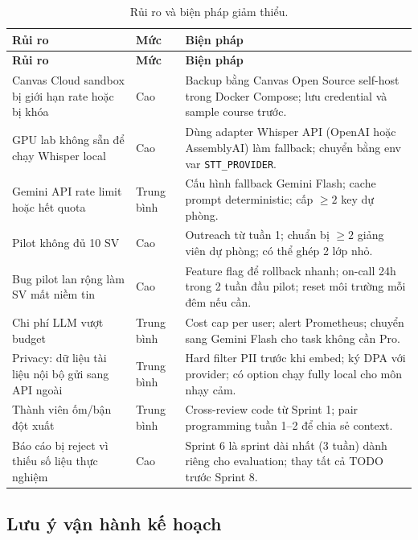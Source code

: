 \begin{longtable}{|p{4.5cm}|p{1.5cm}|p{8.5cm}|}
    \caption{Rủi ro và biện pháp giảm thiểu.}
    \label{tab:risks-gd2} \\
    \hline
    \textbf{Rủi ro} & \textbf{Mức} & \textbf{Biện pháp} \\
    \hline
    \endfirsthead
    \hline
    \textbf{Rủi ro} & \textbf{Mức} & \textbf{Biện pháp} \\
    \hline
    \endhead

    Canvas Cloud sandbox bị giới hạn rate hoặc bị khóa
        & Cao
        & Backup bằng Canvas Open Source self-host trong Docker Compose; lưu credential và sample course trước. \\ \hline
    GPU lab không sẵn để chạy Whisper local
        & Cao
        & Dùng adapter Whisper API (OpenAI hoặc AssemblyAI) làm fallback; chuyển bằng env var \texttt{STT\_PROVIDER}. \\ \hline
    Gemini API rate limit hoặc hết quota
        & Trung bình
        & Cấu hình fallback Gemini Flash; cache prompt deterministic; cấp $\geq 2$ key dự phòng. \\ \hline
    Pilot không đủ 10 SV
        & Cao
        & Outreach từ tuần 1; chuẩn bị $\geq 2$ giảng viên dự phòng; có thể ghép 2 lớp nhỏ. \\ \hline
    Bug pilot lan rộng làm SV mất niềm tin
        & Cao
        & Feature flag để rollback nhanh; on-call 24h trong 2 tuần đầu pilot; reset môi trường mỗi đêm nếu cần. \\ \hline
    Chi phí LLM vượt budget
        & Trung bình
        & Cost cap per user; alert Prometheus; chuyển sang Gemini Flash cho task không cần Pro. \\ \hline
    Privacy: dữ liệu tài liệu nội bộ gửi sang API ngoài
        & Trung bình
        & Hard filter PII trước khi embed; ký DPA với provider; có option chạy fully local cho môn nhạy cảm. \\ \hline
    Thành viên ốm/bận đột xuất
        & Trung bình
        & Cross-review code từ Sprint 1; pair programming tuần 1--2 để chia sẻ context. \\ \hline
    Báo cáo bị reject vì thiếu số liệu thực nghiệm
        & Cao
        & Sprint 6 là sprint dài nhất (3 tuần) dành riêng cho evaluation; thay tất cả TODO trước Sprint 8. \\ \hline
\end{longtable}

\subsection{Lưu ý vận hành kế hoạch}
\label{subsec:plan-notes-gd2}

